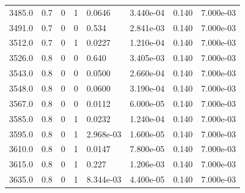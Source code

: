 \documentclass[preview]{standalone}
\begin{document}
{{{{{{{\begin{tabular}{L{1.2cm}C{1.2cm} C{0.3cm}C{0.5cm} C{1.4cm}C{1.4cm} C{1.4cm}C{1.4cm}}
  3485.0  &   0.7  & 0     &  1 &  0.0646  & 3.440e-04  & 0.140 &  7.000e-03   \\ 
  3491.0  &   0.7  & 0     &  0 &  0.534  & 2.841e-03  & 0.140 &  7.000e-03   \\ 
  3512.0  &   0.7  & 0     &  1 &  0.0227  & 1.210e-04  & 0.140 &  7.000e-03   \\ 
  3526.0  &   0.8  & 0     &  0 &  0.640  & 3.405e-03  & 0.140 &  7.000e-03   \\ 
  3543.0  &   0.8  & 0     &  0 &  0.0500  & 2.660e-04  & 0.140 &  7.000e-03   \\ 
  3548.0  &   0.8  & 0     &  0 &  0.0600  & 3.190e-04  & 0.140 &  7.000e-03   \\ 
  3567.0  &   0.8  & 0     &  0 &  0.0112  & 6.000e-05  & 0.140 &  7.000e-03   \\ 
  3585.0  &   0.8  & 0     &  1 &  0.0232  & 1.240e-04  & 0.140 &  7.000e-03   \\ 
  3595.0  &   0.8  & 0     &  1 &  2.968e-03  & 1.600e-05  & 0.140 &  7.000e-03   \\ 
  3610.0  &   0.8  & 0     &  1 &  0.0147  & 7.800e-05  & 0.140 &  7.000e-03   \\ 
  3615.0  &   0.8  & 0     &  1 &  0.227  & 1.206e-03  & 0.140 &  7.000e-03   \\ 
  3635.0  &   0.8  & 0     &  1 &  8.344e-03  & 4.400e-05  & 0.140 &  7.000e-03   \\ 
\hline 
\end{tabular} 

}}}}}}}
\end{document}
